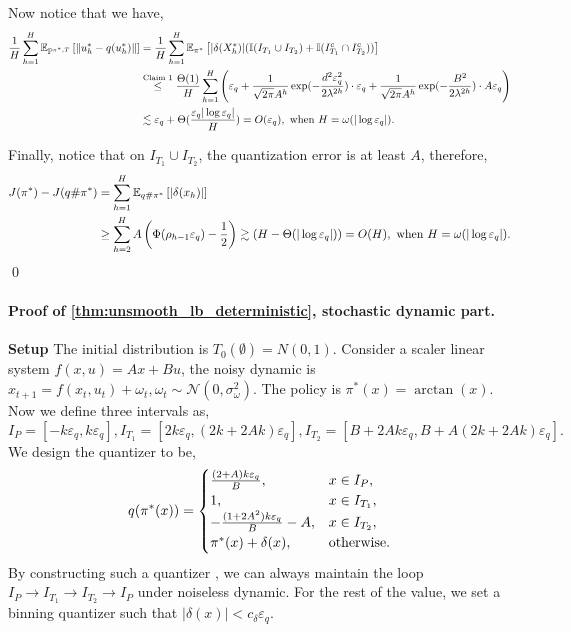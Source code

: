 \documentclass{article}
\let\oldparagraph\paragraph
\renewcommand{\paragraph}[1]{\oldparagraph{#1.}}
\begin{document}
    Now notice that we have,
    \begin{align*}
        \frac{1}{H}\sum_{h=1}^H\mathbb E_{\mathbb P^{\pi^*, T}}\left[\|u_h^*-q(u_h^*)\|\right]&= \frac{1}{H}\sum_{h=1}^H\mathbb E_{\pi^*}\left[|\delta(X_h^*)|(\mathbb I(I_{T_1}\cup I_{T_2})+\mathbb I(I_{T_1}^c\cap I_{T_2}^c))\right]\\&\overset{\textnormal{Claim 1}}{\leq} \frac{\Theta(1)}{H}\sum_{h=1}^H\left(\varepsilon_q+ \frac{1}{\sqrt {2\pi}A^h}\exp(-\frac{d^2\varepsilon_q^2}{2 \lambda^{2h}})\cdot\varepsilon_q +\frac{1}{\sqrt {2\pi}A^h}\exp(-\frac{B^2}{2\lambda^{2h}})\cdot A\varepsilon_q\right)\\
        &\lesssim \varepsilon_q+\Theta(\frac{\varepsilon_q|\log \varepsilon_q|}{H})=O(\varepsilon_q), \textnormal{ when }H=\omega(|\log\varepsilon_q|) .
    \end{align*}

    
    Finally, notice that on $I_{T_1}\cup I_{T_2}$, the quantization error is at least $A$, therefore,
    \begin{align*}
        J(\pi^*)-J(q\#\pi^*)&=\sum_{h=1}^H\mathbb E_{q\#\pi^*}\left[|\delta(x_h)|\right]\\&\geq \sum_{h=2}^H A\left(\Phi(\rho_{h-1}\varepsilon_q)-\frac{1}{2}\right)\gtrsim (H-\Theta(|\log\varepsilon_q|))=O(H), \textnormal{ when } H=\omega(|\log\varepsilon_q|).  
    \end{align*}
\qed


\paragraph{Proof of \cref{thm:unsmooth_lb_deterministic}, stochastic dynamic part} 

\textbf{Setup} The initial distribution is $T_0(\emptyset)=N(0,1)$. Consider a scaler linear system $f(x,u)=Ax+Bu$, the noisy dynamic is $x_{t+1}=f(x_t,u_t)+\omega_t, \omega_t\sim \mathcal N(0, \sigma_{\omega}^2)$. The policy is $\pi^*(x)=\arctan(x)$. Now we define three intervals as,
\begin{equation*}
   I_P=[-k\varepsilon_q, k\varepsilon_q], I_{T_1}=[2k\varepsilon_q, (2k+2Ak)\varepsilon_q], I_{T_2}=[B+2Ak\varepsilon_q, B+A(2k+2Ak)\varepsilon_q].
\end{equation*}
We design the quantizer to be,
\begin{equation*}
    q(\pi^*(x))=\begin{cases}
        \frac{(2+A)k\varepsilon_q}{B}, &x\in I_P,\\
        1, &x\in I_{T_1},\\
        -\frac{(1+2A^2)k\varepsilon_q}{B}-A, &x\in I_{T_2},\\
        \pi^*(x)+\delta(x), &\textnormal{otherwise}.
    \end{cases}
\end{equation*}
By constructing such a quantizer , we can always maintain the loop $I_P\rightarrow I_{T_1}\rightarrow I_{T_2} \rightarrow I_P$ under noiseless dynamic. For the rest of the value, we set a binning quantizer such that $|\delta(x)|<c_\delta\varepsilon_q$. 
\end{document}
